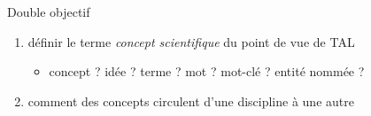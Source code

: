 \begin{frame}{Double objectif}
\begin{enumerate}
	\item définir le terme \textit{concept scientifique} du point de vue de \textsc{TAL}
	\begin{itemize}
		\item concept ? idée ? terme ? mot ? mot-clé ? entité nommée ?
	\end{itemize}
	\item comment des concepts circulent d’une discipline à une autre
\end{enumerate}


\end{frame}